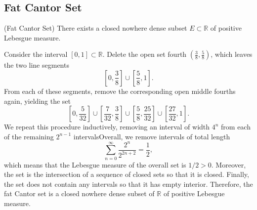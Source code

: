 \documentclass{article}
\begin{document}
\subsection{Fat Cantor Set}
\begin{prb}{(Fat Cantor Set)}
	There exists a closed nowhere dense subset $E \subset \mathbb{R}$ of positive Lebesgue measure. 
\end{prb}
\begin{solutions}
	Consider the interval $[0,1] \subset \mathbb{R}$. Delete the open set fourth $(\frac{3}{8}, \frac{5}{8})$, which leaves the two line segments 
		\begin{equation}
			\left[0, \frac{3}{8}\right] \cup \left[\frac{5}{8}, 1\right]. 
		\end{equation}
	From each of these segments, remove the corresponding open middle fourths again, yielding the set 
		\begin{equation}
			\left[0,\frac{5}{32}\right] \cup \left[\frac{7}{32}, \frac{3}{8}\right] \cup \left[\frac{5}{8}, \frac{25}{32}\right] \cup \left[\frac{27}{32}, 1\right]. 
		\end{equation}
	We repeat this procedure inductively, removing an interval of width $4^{n}$ from each of the remaining $2^{n - 1}$ intervalsOverall, we remove intervals of total length 
		\begin{equation}
			\sum_{n = 0}^{\infty}\frac{2^{n}}{2^{2n + 2}} = \frac{1}{2}, 
		\end{equation}
	which means that the Lebesgue measure of the overall set is $1/2 > 0$. Moreover, the set is the intersection of a sequence of closed sets so that it is closed. Finally, the set does not contain any intervals so that it has empty interior. Therefore, the fat Cantor set is a closed nowhere dense subset of $\mathbb{R}$ of positive Lebesgue measure. 
\end{solutions}
\end{document}
